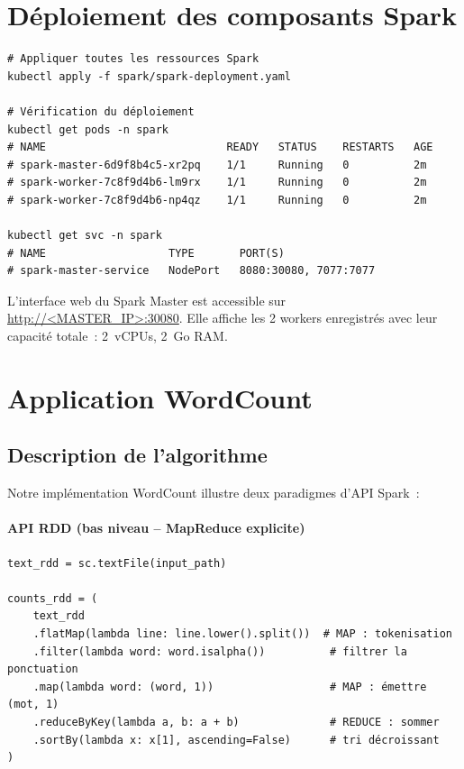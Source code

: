 \documentclass[12pt,a4paper,french]{report}
\begin{document}
\section{Déploiement des composants Spark}

\begin{lstlisting}[style=bash, caption={Déploiement Spark dans Kubernetes}]
# Appliquer toutes les ressources Spark
kubectl apply -f spark/spark-deployment.yaml

# Vérification du déploiement
kubectl get pods -n spark
# NAME                            READY   STATUS    RESTARTS   AGE
# spark-master-6d9f8b4c5-xr2pq    1/1     Running   0          2m
# spark-worker-7c8f9d4b6-lm9rx    1/1     Running   0          2m
# spark-worker-7c8f9d4b6-np4qz    1/1     Running   0          2m

kubectl get svc -n spark
# NAME                   TYPE       PORT(S)
# spark-master-service   NodePort   8080:30080, 7077:7077
\end{lstlisting}

\begin{resultbox}
L'interface web du Spark Master est accessible sur \url{http://<MASTER_IP>:30080}. Elle affiche les 2 workers enregistrés avec leur capacité totale~: 2~vCPUs, 2~Go RAM.
\end{resultbox}

\section{Application WordCount}

\subsection{Description de l'algorithme}

Notre implémentation WordCount illustre deux paradigmes d'API Spark~:

\paragraph{API RDD (bas niveau -- MapReduce explicite)}
\begin{lstlisting}[style=python, caption={WordCount via l'API RDD}]
text_rdd = sc.textFile(input_path)

counts_rdd = (
    text_rdd
    .flatMap(lambda line: line.lower().split())  # MAP : tokenisation
    .filter(lambda word: word.isalpha())          # filtrer la ponctuation
    .map(lambda word: (word, 1))                  # MAP : émettre (mot, 1)
    .reduceByKey(lambda a, b: a + b)              # REDUCE : sommer
    .sortBy(lambda x: x[1], ascending=False)      # tri décroissant
)
\end{lstlisting}
\end{document}
